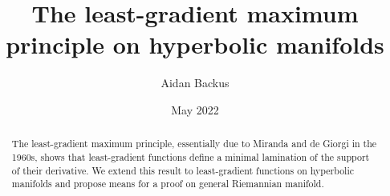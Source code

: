 \documentclass[reqno,12pt,letterpaper]{amsart}
\title[Hyperbolic least-gradient maximum principle]{The least-gradient maximum principle on hyperbolic manifolds}
\author{Aidan Backus}
\date{May 2022}
\newcommand{\CC}{\mathbf{C}}
\newcommand{\vol}{\mathrm{vol}}
\newcommand{\dfn}[1]{\emph{#1}\index{#1}}
\newtheorem{theorem}{Theorem}[section]
\theoremstyle{definition}
\numberwithin{equation}{section}
\begin{document}
\begin{abstract}
The least-gradient maximum principle, essentially due to Miranda and de Giorgi in the 1960s, shows that least-gradient functions define a minimal lamination of the support of their derivative.
We extend this result to least-gradient functions on hyperbolic manifolds and propose means for a proof on general Riemannian manifold.
\end{abstract}

\maketitle



\let\clearpage\relax










\end{document}
